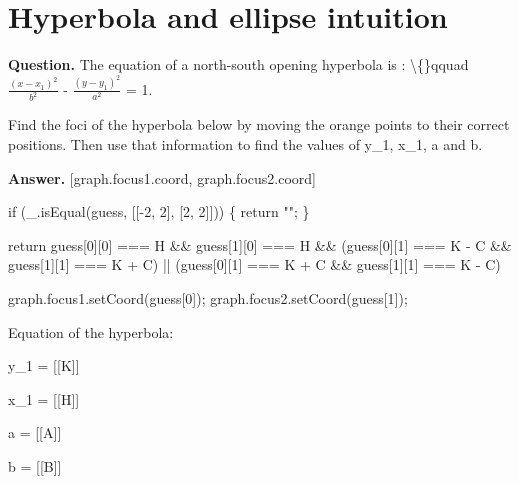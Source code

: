 \documentclass{article}
\begin{document}
\section*{Hyperbola and ellipse intuition}
\textbf{Question.} The equation of a north-south opening hyperbola is :
                        \textbackslash\{\}qquad $\frac{(x - x_1)^2}{b^2}$ - $\frac{(y - y_1)^2}{a^2}$ = 1.
                    
                    
                        Find the foci of the hyperbola below by moving the orange points to their correct positions.
                        Then use that information to find the values of y\_1, x\_1, a and b.

\textbf{Answer.} [graph.focus1.coord, graph.focus2.coord]
                        
                            if (\_.isEqual(guess, [[-2, 2], [2, 2]])) \{
                                return "";
                            \}

                            return guess[0][0] === H \&\& guess[1][0] === H \&\&
                                (guess[0][1] === K - C \&\& guess[1][1] === K + C) ||
                                (guess[0][1] === K + C \&\& guess[1][1] === K - C)
                        
                        
                            graph.focus1.setCoord(guess[0]);
                            graph.focus2.setCoord(guess[1]);
                        
                    

                    
                        Equation of the hyperbola:
                        
                            
                                y\_1 = 
                                [[K]]
                            
                            
                                x\_1 = 
                                [[H]]
                            
                            
                                a = 
                                [[A]]
                            
                            
                                b = 
                                [[B]]
\end{document}
